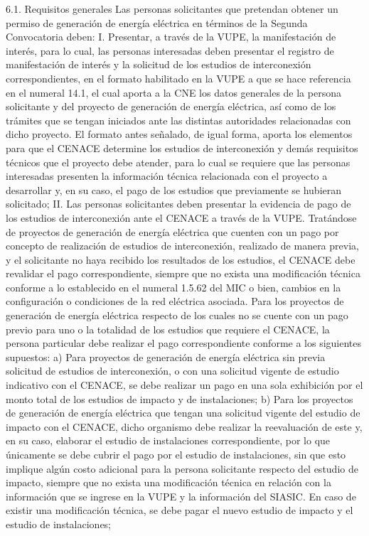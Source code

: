 6.1. Requisitos generales
Las personas solicitantes que pretendan obtener un permiso de generación de energía eléctrica en términos de la Segunda Convocatoria deben:
I. Presentar, a través de la VUPE, la manifestación de interés, para lo cual, las personas interesadas deben presentar el registro de manifestación de interés y la solicitud de los estudios de interconexión correspondientes, en el formato habilitado en la VUPE a que se hace referencia en el numeral 14.1, el cual aporta a la CNE los datos generales de la persona solicitante y del proyecto de generación de energía eléctrica, así como de los trámites que se tengan iniciados ante las distintas autoridades relacionadas con dicho proyecto.
El formato antes señalado, de igual forma, aporta los elementos para que el CENACE determine los estudios de interconexión y demás requisitos técnicos que el proyecto debe atender, para lo cual se requiere que las personas interesadas presenten la información técnica relacionada con el proyecto a desarrollar y, en su caso, el pago de los estudios que previamente se hubieran solicitado;
II. Las personas solicitantes deben presentar la evidencia de pago de los estudios de interconexión ante el CENACE a través de la VUPE.
Tratándose de proyectos de generación de energía eléctrica que cuenten con un pago por concepto de realización de estudios de interconexión, realizado de manera previa, y el solicitante no haya recibido los resultados de los estudios, el CENACE debe revalidar el pago correspondiente, siempre que no exista una modificación técnica conforme a lo establecido en el numeral 1.5.62 del MIC o bien, cambios en la configuración o condiciones de la red eléctrica asociada.
Para los proyectos de generación de energía eléctrica respecto de los cuales no se cuente con un pago previo para uno o la totalidad de los estudios que requiere el CENACE, la persona particular debe realizar el pago correspondiente conforme a los siguientes supuestos:
a) Para proyectos de generación de energía eléctrica sin previa solicitud de estudios de interconexión, o con una solicitud vigente de estudio indicativo con el CENACE, se debe realizar un pago en una sola exhibición por el monto total de los estudios de impacto y de instalaciones;
b) Para los proyectos de generación de energía eléctrica que tengan una solicitud vigente del estudio de impacto con el CENACE, dicho organismo debe realizar la reevaluación de este y, en su caso, elaborar el estudio de instalaciones correspondiente, por lo que únicamente se debe cubrir el pago por el estudio de instalaciones, sin que esto implique algún costo adicional para la persona solicitante respecto del estudio de impacto, siempre que no exista una modificación técnica en relación con la información que se ingrese en la VUPE y la información del SIASIC. En caso de existir una modificación técnica, se debe pagar el nuevo estudio de impacto y el estudio de instalaciones;
